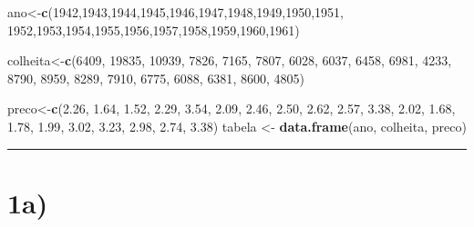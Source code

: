 \documentclass[11pt,]{article}
\newenvironment{Shaded}{\begin{snugshade}}{\end{snugshade}}
\newcommand{\KeywordTok}[1]{\textcolor[rgb]{0.13,0.29,0.53}{\textbf{{#1}}}}
\newcommand{\DecValTok}[1]{\textcolor[rgb]{0.00,0.00,0.81}{{#1}}}
\newcommand{\FloatTok}[1]{\textcolor[rgb]{0.00,0.00,0.81}{{#1}}}
\newcommand{\StringTok}[1]{\textcolor[rgb]{0.31,0.60,0.02}{{#1}}}
\newcommand{\NormalTok}[1]{{#1}}
\begin{document}
\begin{Shaded}
\begin{Highlighting}[]
\NormalTok{ano<-}\KeywordTok{c}\NormalTok{(}\DecValTok{1942}\NormalTok{,}\DecValTok{1943}\NormalTok{,}\DecValTok{1944}\NormalTok{,}\DecValTok{1945}\NormalTok{,}\DecValTok{1946}\NormalTok{,}\DecValTok{1947}\NormalTok{,}\DecValTok{1948}\NormalTok{,}\DecValTok{1949}\NormalTok{,}\DecValTok{1950}\NormalTok{,}\DecValTok{1951}\NormalTok{,}
       \DecValTok{1952}\NormalTok{,}\DecValTok{1953}\NormalTok{,}\DecValTok{1954}\NormalTok{,}\DecValTok{1955}\NormalTok{,}\DecValTok{1956}\NormalTok{,}\DecValTok{1957}\NormalTok{,}\DecValTok{1958}\NormalTok{,}\DecValTok{1959}\NormalTok{,}\DecValTok{1960}\NormalTok{,}\DecValTok{1961}\NormalTok{)}

\NormalTok{colheita<-}\KeywordTok{c}\NormalTok{(}\DecValTok{6409}\NormalTok{, }\DecValTok{19835}\NormalTok{, }\DecValTok{10939}\NormalTok{, }\DecValTok{7826}\NormalTok{, }\DecValTok{7165}\NormalTok{, }\DecValTok{7807}\NormalTok{, }\DecValTok{6028}\NormalTok{, }\DecValTok{6037}\NormalTok{, }\DecValTok{6458}\NormalTok{, }\DecValTok{6981}\NormalTok{,}
            \DecValTok{4233}\NormalTok{, }\DecValTok{8790}\NormalTok{, }\DecValTok{8959}\NormalTok{, }\DecValTok{8289}\NormalTok{, }\DecValTok{7910}\NormalTok{, }\DecValTok{6775}\NormalTok{, }\DecValTok{6088}\NormalTok{, }\DecValTok{6381}\NormalTok{, }\DecValTok{8600}\NormalTok{, }\DecValTok{4805}\NormalTok{)}

\NormalTok{preco<-}\KeywordTok{c}\NormalTok{(}\FloatTok{2.26}\NormalTok{, }\FloatTok{1.64}\NormalTok{, }\FloatTok{1.52}\NormalTok{, }\FloatTok{2.29}\NormalTok{, }\FloatTok{3.54}\NormalTok{, }\FloatTok{2.09}\NormalTok{, }\FloatTok{2.46}\NormalTok{, }\FloatTok{2.50}\NormalTok{, }\FloatTok{2.62}\NormalTok{, }\FloatTok{2.57}\NormalTok{,}
         \FloatTok{3.38}\NormalTok{, }\FloatTok{2.02}\NormalTok{, }\FloatTok{1.68}\NormalTok{, }\FloatTok{1.78}\NormalTok{, }\FloatTok{1.99}\NormalTok{, }\FloatTok{3.02}\NormalTok{, }\FloatTok{3.23}\NormalTok{, }\FloatTok{2.98}\NormalTok{, }\FloatTok{2.74}\NormalTok{, }\FloatTok{3.38}\NormalTok{)}
\NormalTok{tabela <-}\StringTok{ }\KeywordTok{data.frame}\NormalTok{(ano, colheita, preco)}
\end{Highlighting}
\end{Shaded}

\begin{center}\rule{0.5\linewidth}{\linethickness}\end{center}

\section{1a)}\label{a}
\end{document}
